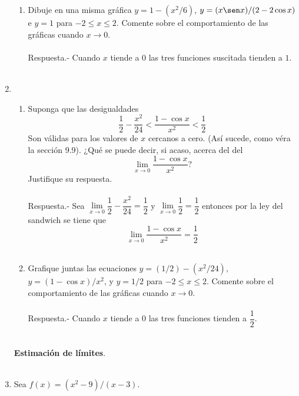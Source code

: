 \begin{enumerate}
\begin{enumerate}[\bfseries a)]
    \item Dibuje en una misma gráfica $y=1-(x^2/6)$, $y=(x\sen x)/(2-2\cos x)$ e $y=1$ para $-2\leq x \leq 2$. Comente sobre el comportamiento de las gráficas cuando $x\to 0$.\\\\
	Respuesta.-\; Cuando $x$ tiende a $0$ las tres funciones suscitada tienden a $1$.\\\\

\end{enumerate}

\item  
    \begin{enumerate}[\bfseries (a)]
    \item Suponga que las desigualdades $$\dfrac{1}{2}-\dfrac{x^2}{24}<\dfrac{1-\cos x}{x^2}<\dfrac{1}{2}$$
    Son válidas para los valores de $x$ cercanos a cero. (Así sucede, como véra la sección 9.9). ¿Qué se puede decir, si acaso, acerca del del $$\lim_{x\to 0}\dfrac{1-\cos x}{x^2}?$$
    Justifique su respuesta.\\\\
	    Respuesta.-\; Sea $\lim\limits_{x\to 0} \dfrac{1}{2}-\dfrac{x^2}{24} = \dfrac{1}{2}$ y $\lim\limits_{x\to 0}\dfrac{1}{2}=\dfrac{1}{2}$ entonces por la ley del sandwich se tiene que $$\lim_{x\to 0} \dfrac{1-\cos x}{x^2}=\dfrac{1}{2}$$ \\

    \item  Grafique juntas las ecuaciones $y=(1/2)-(x^2/24),$ $y=(1-\cos x)/x^2$, y $y=1/2$ para $-2\leq x\leq 2$. Comente sobre el comportamiento de las gráficas cuando $x\to 0$.\\\\
	Respuesta.-\; Cuando $x$ tiende a $0$ las tres funciones tienden a $\dfrac{1}{2}$.\\\\

    \end{enumerate}

\textbf{Estimación de límites}.\\\\

\item  Sea $f(x)=(x^2-9)/(x-3)$.
\begin{enumerate}[\bfseries a)]


\end{enumerate}
\end{enumerate}
